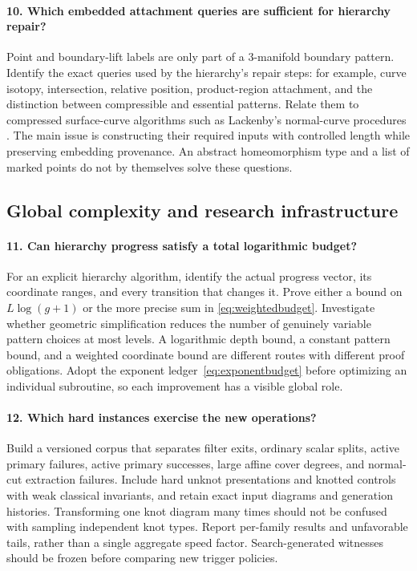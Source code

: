 \documentclass[11pt,a4paper]{article}
\theoremstyle{definition}\newtheorem{definition}[theorem]{Definition}
\theoremstyle{remark}\newtheorem{remark}[theorem]{Remark}
\begin{document}
\paragraph{10. Which embedded attachment queries are sufficient for hierarchy repair?}
Point and boundary-lift labels are only part of a 3-manifold boundary
pattern. Identify the exact queries used by the hierarchy's repair steps:
for example, curve isotopy, intersection, relative position, product-region
attachment, and the distinction between compressible and essential
patterns. Relate them to compressed surface-curve algorithms such as
Lackenby's normal-curve procedures \cite{lackenby-curves}. The main issue is
constructing their required inputs with controlled length while preserving
embedding provenance. An abstract homeomorphism type and a list of marked
points do not by themselves solve these questions.

\subsection{Global complexity and research infrastructure}

\paragraph{11. Can hierarchy progress satisfy a total logarithmic budget?}
For an explicit hierarchy algorithm, identify the actual progress vector,
its coordinate ranges, and every transition that changes it. Prove either
a bound on $L\log(g+1)$ or the more precise sum in
\eqref{eq:weightedbudget}. Investigate whether geometric simplification
reduces the number of genuinely variable pattern choices at most levels.
A logarithmic depth bound, a constant pattern bound, and a weighted
coordinate bound are different routes with different proof obligations.
Adopt the exponent ledger~\eqref{eq:exponentbudget} before optimizing an
individual subroutine, so each improvement has a visible global role.

\paragraph{12. Which hard instances exercise the new operations?}
Build a versioned corpus that separates filter exits, ordinary scalar
splits, active primary failures, active primary successes, large affine
cover degrees, and normal-cut extraction failures. Include hard unknot
presentations and knotted controls with weak classical invariants, and
retain exact input diagrams and generation histories. Transforming one
knot diagram many times should not be confused with sampling independent
knot types. Report per-family results and unfavorable tails, rather than
a single aggregate speed factor. Search-generated witnesses should be
frozen before comparing new trigger policies.
\end{document}
